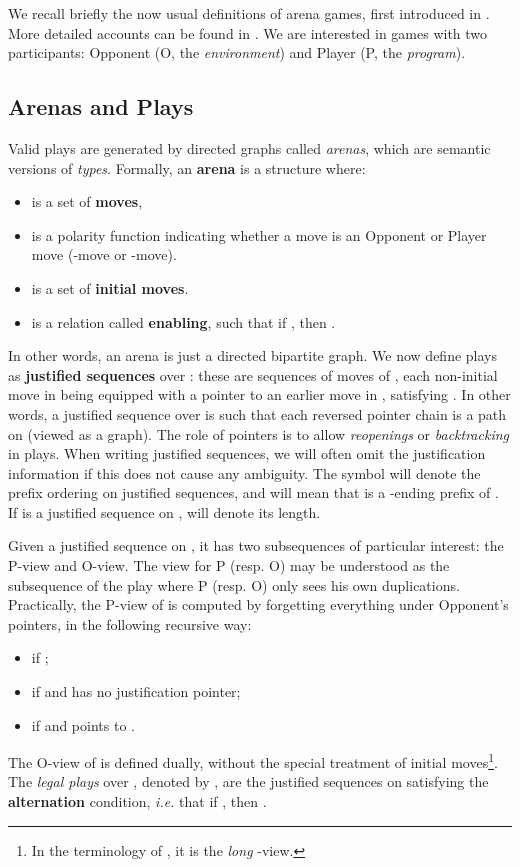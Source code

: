 \documentclass{article}
\begin{document}
We recall briefly the now usual definitions of arena games, first introduced in \cite{hyland-ong}. More detailed accounts
can be found in \cite{fpc2000,harmer2004innocent}. We are interested in games with two participants: Opponent
(O, the \emph{environment}) and Player (P, the \emph{program}). 


\subsection{Arenas and Plays}

Valid plays are generated by directed graphs called \emph{arenas}, which are semantic versions of \emph{types}. 
Formally, an \textbf{arena} is a structure  where:
\begin{itemize}
\item  is a set of \textbf{moves},
\item  is a polarity function indicating whether
a move is an Opponent or Player move (-move or -move).
\item  is a set of \textbf{initial moves}.
\item  is a relation called \textbf{enabling}, such that
if , then .
\end{itemize}
In other words, an arena is just a directed bipartite graph. We now define plays as \textbf{justified sequences} over : these are
sequences  of moves of , each non-initial move  in  being equipped with a pointer to an earlier move
 in , satisfying . In other words, a justified sequence  over  is such that
each reversed pointer chain  is a path on  (viewed as a graph).
The role of pointers is to allow \emph{reopenings} or \emph{backtracking} in plays. When writing justified sequences, we will often omit the
justification information if this does not cause any ambiguity. The symbol  will denote the prefix ordering on justified
sequences, and  will mean that  is a -ending prefix of .
If  is a justified sequence on ,  will denote its length.

Given a justified sequence  on , it has two subsequences of particular interest: the P-view and O-view.
The view for P (resp. O) may be understood as the subsequence of the play where P (resp. O) only sees his own duplications.
Practically, the P-view  of  is computed by forgetting everything
under Opponent's pointers, in the following recursive way:
\begin{itemize}
\item  if ;
\item  if  and  has no justification pointer;
\item  if  and  points to .
\end{itemize}
The O-view  of  is defined dually, without the special treatment of initial moves\footnote{In the terminology of \cite{harmer2004innocent}, it is the \emph{long} -view.}. 
The \emph{legal plays} over , denoted by , are the
justified sequences  on  satisfying the \textbf{alternation} condition, \emph{i.e.} that 
if , then .
\end{document}
